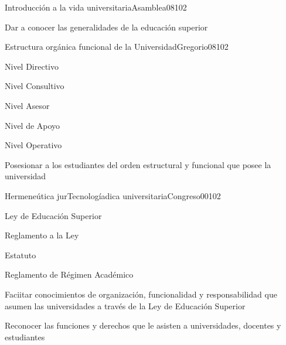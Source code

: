 \begin{syllabus}
\begin{unit}{Introducción a la vida universitaria}{Asamblea08}{10}{2}
   \begin{unitgoals}
      \item Dar a conocer las generalidades de la educación superior
   \end{unitgoals}
\end{unit}

\begin{unit}{Estructura orgánica funcional de la Universidad}{Gregorio08}{10}{2}
   \begin{topics}
        \item Nivel Directivo
	\item Nivel Consultivo
	\item Nivel Asesor
	\item Nivel de Apoyo
	\item Nivel Operativo
  \end{topics}

   \begin{unitgoals}
      \item Posesionar a los estudiantes del orden estructural y funcional que posee la universidad
   \end{unitgoals}
\end{unit}

\begin{unit}{Hermeneútica jurTecnologíadica universitaria}{Congreso00}{10}{2}
   \begin{topics}
        \item Ley de Educación Superior 
	\item Reglamento a la Ley
	\item Estatuto
	\item Reglamento de Régimen Académico
   \end{topics}

   \begin{unitgoals}
      \item Faciitar conocimientos de organización, funcionalidad y responsabilidad que asumen las universidades a través de la Ley de Educación Superior
      \item Reconocer las funciones y derechos que le asisten a universidades, docentes y estudiantes
   \end{unitgoals}
\end{unit}

\begin{coursebibliography}
\end{coursebibliography}

\end{syllabus}
